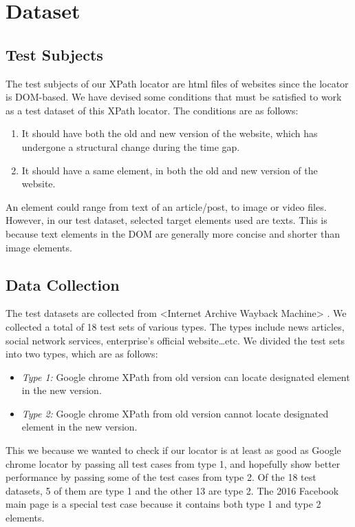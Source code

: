 \documentclass[format=acmlarge, nonacm=true]{acmart}
\begin{document}
\section{Dataset}
\subsection{Test Subjects}
The test subjects of our XPath locator are html files of websites since the locator is DOM-based. We have devised some conditions that must be satisfied to work as a test dataset of this XPath locator. The conditions are as follows:
\begin{enumerate}
	\item It should have both the old and new version of the website, which has undergone a structural change during the time gap.
	\item It should have a same element, in both the old and new version of the website. 
\end{enumerate}
An element could range from text of an article/post, to image or video files. However, in our test dataset, selected target elements used are texts. This is because text elements in the DOM are generally more concise and shorter than image elements.


\subsection{Data Collection}	
The test datasets are collected from <Internet Archive Wayback Machine> . We collected a total of 18 test sets of various types. The types include news articles, social network services, enterprise’s official website…etc. We divided the test sets into two types, which are as follows:
\begin{itemize}
	\item \emph{Type 1:} Google chrome XPath from old version can locate designated element in the new version.
	\item \emph{Type 2:} Google chrome XPath from old version cannot locate designated element in the new version.
\end{itemize}

This we because we wanted to check if our locator is at least as good as Google chrome locator by passing all test cases from type 1, and hopefully show better performance by passing some of the test cases from type 2. Of the 18 test datasets, 5 of them are type 1 and the other 13 are type 2. The 2016 Facebook main page is a special test case because it contains both type 1 and type 2 elements. 
\end{document}
